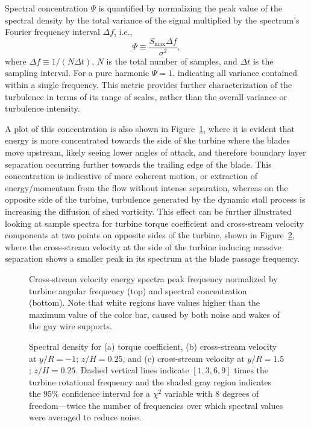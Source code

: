 Spectral concentration $\Psi$ is quantified by normalizing the peak value of the
spectral density by the total variance of the signal multiplied by the
spectrum's Fourier frequency interval $\Delta f$, i.e.,
\begin{equation}
\Psi \equiv \frac{S_{\max} \Delta f}{\sigma^2},
\label{eq-spec_cont}
\end{equation}
where $\Delta f \equiv 1/(N \Delta t)$, $N$ is the total number of samples, and
$\Delta t$ is the sampling interval. For a pure harmonic $\Psi = 1$, indicating
all variance contained within a single frequency. This metric provides further
characterization of the turbulence in terms of its range of scales, rather than
the overall variance or turbulence intensity.

A plot of this concentration is also shown in Figure~\ref{fig-fcont}, where it
is evident that energy is more concentrated towards the side of the  turbine
where the blades move upstream, likely seeing lower angles of attack, and
therefore boundary layer separation occurring further towards the trailing edge
of the blade. This concentration is indicative of more coherent motion, or
extraction of energy/momentum from the flow without intense separation, whereas
on the opposite side of the turbine, turbulence generated by the dynamic stall
process is increasing the diffusion of shed vorticity. This effect can be
further illustrated looking at sample spectra for turbine torque coefficient and
cross-stream velocity components at two points on opposite sides of the turbine,
shown in Figure~\ref{fig-multispec}, where the cross-stream velocity at the side
of the turbine inducing massive separation shows a smaller peak in its spectrum
at the blade passage frequency.

\begin{figure}[h]
    \centering
    \caption{Cross-stream velocity energy spectra peak frequency normalized by
        turbine angular frequency (top) and spectral concentration (bottom). Note that white 
        regions have values higher than the maximum value of the color bar, caused by both 
        noise and wakes of the guy wire supports.}
    \label{fig-fcont}
\end{figure}

\begin{figure}[h]
    \centering
    \caption{Spectral density for (a) torque coefficient, (b) cross-stream velocity at
        $y/R = -1$; $z/H = 0.25$, and (c) cross-stream velocity at 
        $y/R = 1.5$; $z/H = 0.25$. Dashed vertical lines indicate $[1, 3, 6, 9]$
        times the turbine rotational frequency and the shaded gray region indicates the 
        95\% confidence interval for a $\chi^2$ variable with 8 degrees of freedom---twice 
        the number of frequencies over which spectral values were averaged to reduce noise.}
    \label{fig-multispec}
\end{figure}


